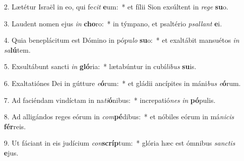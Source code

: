 2. Lætétur Israël in eo, qui fe\textit{cit} \textbf{e}um:~*  et fílii Sion exsúltent in \textit{re}\textit{ge} \textbf{su}o.\

3. Laudent nomen ejus \textit{in} \textbf{cho}ro:~*  in týmpano, et psaltério \textit{psal}\textit{lant} \textbf{e}i.\

4. Quia beneplácitum est Dómino in pópu\textit{lo} \textbf{su}o:~*  et exaltábit mansuétos \textit{in} \textit{sa}\textbf{lú}tem.\

5. Exsultábunt sancti \textit{in} \textbf{gló}ria:~*  lætabúntur in cubí\textit{li}\textit{bus} \textbf{su}is.\

6. Exaltatiónes Dei in gútture \textit{e}\textbf{ó}rum:~*  et gládii ancípites in máni\textit{bus} \textit{e}\textbf{ó}rum.\

7. Ad faciéndam vindíctam in na\textit{ti}\textbf{ó}nibus:~*  increpatió\textit{nes} \textit{in} \textbf{pó}pulis.\

8. Ad alligándos reges eórum in \textit{com}\textbf{pé}dibus:~*  et nóbiles eórum in má\textit{ni}\textit{cis} \textbf{fér}reis.\

9. Ut fáciant in eis judícium \textit{con}\textbf{scríp}tum:~*  glória hæc est ómnibus \textit{sanc}\textit{tis} \textbf{e}jus.\

